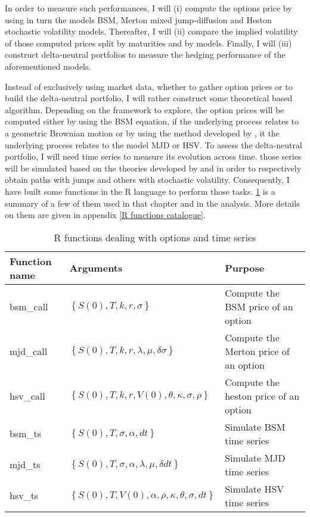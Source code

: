 \documentclass[12pt]{report}
\begin{document}
In order to measure such performances, I will (i) compute the options price by using in turn the models BSM, Merton mixed jump-diffusion and Heston stochastic volatility models. 
Thereafter, I will (ii) compare the implied volatility of those computed prices split by maturities and by models.
Finally, I will (iii) construct delta-neutral portfolios to measure the hedging performance of the aforementioned models.

Instead of exclusively using market data, whether to gather option prices or to build the delta-neutral portfolio, I will rather construct some theoretical based algorithm.
Depending on the framework to explore, the option prices will be computed either by using the BSM equation, if the underlying process relates to a geometric Brownian motion or by using the method developed by \citet{heston1993}, it the underlying process relates to the model MJD or HSV.
To assess the delta-neutral portfolio, I will need time series to measure its evolution across time. those series will be simulated based on the theories developed by \citet{merton76} and \citet{heston1993} in order to respectively obtain paths with jumps and others with stochastic volatility.
Consequently, I have built some functions in the R language to perform those tasks. \cref{t:methodology:r} is a summary of a few of them used in that chapter and in the analysis. More details on them are given in appendix \cref{R functions catalogue}.

\begin{table}[ht]
  \begin{tabularx}{\textwidth}{llX}
    \hline
    Function name & Arguments & Purpose \\
    \hline
    bsm\_call & $\left \{ S(0), T, k, r, \sigma \right \}$ & Compute the BSM price of an option \\
    mjd\_call & $\left \{ S(0), T, k, r, \lambda, \mu, \delta \sigma \right \}$ & Compute the Merton price of an option \\
    hsv\_call & $\left \{ S(0), T, k, r, V(0), \theta, \kappa, \sigma, \rho \right \}$ & Compute the heston price of an option \\
    bsm\_ts & $\left \{ S(0), T, \sigma, \alpha, dt \right \}$ & Simulate BSM time series \\
    mjd\_ts & $\left \{ S(0), T, \sigma, \alpha, \lambda, \mu, \delta dt \right \}$ & Simulate MJD time series \\
    hsv\_ts & $\left \{ S(0), T, V(0), \alpha, \rho, \kappa, \theta, \sigma, dt \right \}$ & Simulate HSV time series \\
  \end{tabularx}
  \caption{R functions dealing with options and time series}
  \label{t:methodology:r}
\end{table}
\end{document}
